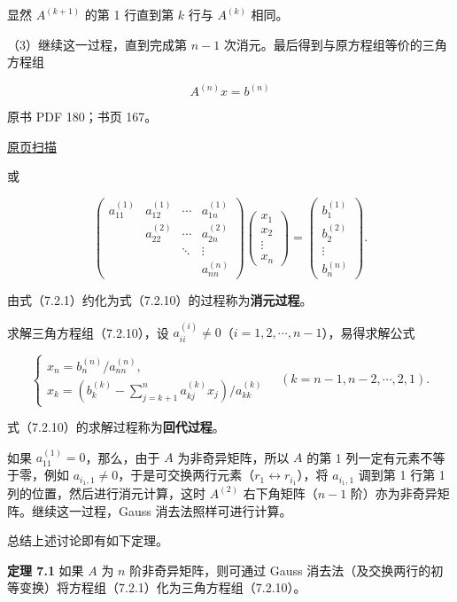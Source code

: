 \documentclass[
  10pt,
  fontset=fandol]{ctexart}
\begin{document}
显然 \(A^{(k+1)}\) 的第 1 行直到第 \(k\) 行与 \(A^{(k)}\) 相同。

（3）继续这一过程，直到完成第 \(n-1\) 次消元。最后得到与原方程组等价的三角方程组

\[A^{(n)}x=b^{(n)}\tag{7.2.10}\]

\clearpage

原书 PDF 180；书页 167。

\href{../../../source-images/pdf-180.jpeg}{原页扫描}

或

\[
\begin{pmatrix}
a_{11}^{(1)}&a_{12}^{(1)}&\cdots&a_{1n}^{(1)}\\
&a_{22}^{(2)}&\cdots&a_{2n}^{(2)}\\
&&\ddots&\vdots\\
&&&a_{nn}^{(n)}
\end{pmatrix}
\begin{pmatrix}x_1\\x_2\\\vdots\\x_n\end{pmatrix}
=\begin{pmatrix}b_1^{(1)}\\b_2^{(2)}\\\vdots\\b_n^{(n)}\end{pmatrix}.
\]

由式（7.2.1）约化为式（7.2.10）的过程称为\textbf{消元过程}。

求解三角方程组（7.2.10），设 \(a_{ii}^{(i)}\ne0\)（\(i=1,2,\cdots,n-1\)），易得求解公式

\[
\begin{cases}
x_n=b_n^{(n)}/a_{nn}^{(n)},\\
x_k=\displaystyle\left(b_k^{(k)}-\sum_{j=k+1}^{n}a_{kj}^{(k)}x_j\right)/a_{kk}^{(k)}
\end{cases}
\quad(k=n-1,n-2,\cdots,2,1).
\tag{7.2.11}
\]

式（7.2.10）的求解过程称为\textbf{回代过程}。

如果 \(a_{11}^{(1)}=0\)，那么，由于 \(A\) 为非奇异矩阵，所以 \(A\) 的第 1 列一定有元素不等于零，例如 \(a_{i_1,1}\ne0\)，于是可交换两行元素（\(r_1\leftrightarrow r_{i_1}\)），将 \(a_{i_1,1}\) 调到第 1 行第 1 列的位置，然后进行消元计算，这时 \(A^{(2)}\) 右下角矩阵（\(n-1\) 阶）亦为非奇异矩阵。继续这一过程，Gauss 消去法照样可进行计算。

总结上述讨论即有如下定理。

\textbf{定理 7.1} 如果 \(A\) 为 \(n\) 阶非奇异矩阵，则可通过 Gauss 消去法（及交换两行的初等变换）将方程组（7.2.1）化为三角方程组（7.2.10）。
\end{document}
